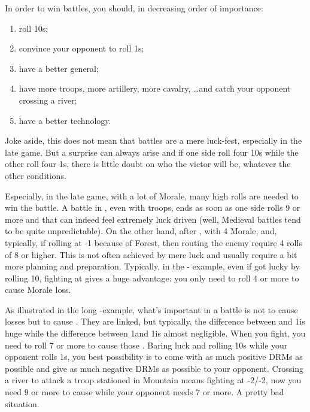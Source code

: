 \begin{playtip}
  In order to win battles, you should, in decreasing order of importance:
  \begin{enumerate}
  \item roll 10s;
  \item convince your opponent to roll 1s;
  \item have a better general;
  \item have more troops, more artillery, more cavalry, \ldots and catch your
    opponent crossing a river;
  \item have a better technology.
  \end{enumerate}
  Joke aside, this does not mean that battles are a mere luck-fest, especially
  in the late game. But a surprise can always arise and if one side roll four
  10s while the other roll four 1s, there is little doubt on who the victor
  will be, whatever the other conditions.

  Especially, in the late game, with a lot of Morale, many high rolls are
  needed to win the battle. A battle in \TMED, even with 
  troops, ends as soon as one side rolls 9 or more and that can indeed feel
  extremely luck driven (well, Medieval battles tend to be quite
  unpredictable). On the other hand, after \TMUS, with 4 Morale, and,
  typically, if rolling at -1 because of Forest, then routing the enemy
  require 4 rolls of 8 or higher. This is not often achieved by mere luck and
  usually require a bit more planning and preparation. Typically, in the
  \SUE- example, even if \SUE got lucky by rolling 10,
  fighting at  gives a huge advantage: you only need to roll 4 or
  more to cause Morale loss.

  As illustrated in the long \FRA-\HIS example, what's important in a battle
  is not to cause losses but to cause \textetoile. They are linked, but
  typically, the difference between \texttd and 1\textetoile is huge while the
  difference between 1\textetoile and 1\texttu\textetoile is almost
  negligible. When you fight, you need to roll 7 or more to cause those
  \textetoile. Baring luck and rolling 10s while your opponent rolls 1s, you
  best possibility is to come with as much positive DRMs as possible and give
  as much negative DRMs as possible to your opponent. Crossing a river to
  attack a troop stationed in Mountain means fighting at -2/-2, now you need 9
  or more to cause \textetoile while your opponent needs 7 or more. A pretty
  bad situation.
\end{playtip}

